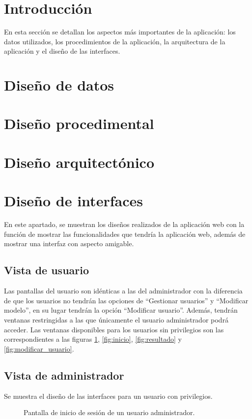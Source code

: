 
\section{Introducción}
En esta sección se detallan los aspectos más importantes de la aplicación: los datos utilizados, los procedimientos de la aplicación, la arquitectura de la aplicación y el diseño de las interfaces.

\section{Diseño de datos}

\section{Diseño procedimental}

\section{Diseño arquitectónico}

\section{Diseño de interfaces}
En este apartado, se muestran los diseños realizados de la aplicación web con la función de mostrar las funcionalidades que tendría la aplicación web, además de mostrar una interfaz con aspecto amigable.

\subsection{Vista de usuario}
Las pantallas del usuario son idénticas a las del administrador con la diferencia de que los usuarios no tendrán las opciones de ``Gestionar usuarios'' y ``Modificar modelo'', en su lugar tendrán la opción ``Modificar usuario''. Además, tendrán ventanas restringidas a las que únicamente el usuario administrador podrá acceder. Las ventanas disponibles para los usuarios sin privilegios son las correspondientes a las figuras \ref{fig:inicio_de_sesion}, \ref{fig:inicio}, \ref{fig:resultado} y \ref{fig:modificar_usuario}.

\subsection{Vista de administrador}
Se muestra el diseño de las interfaces para un usuario con privilegios.
\begin{figure}[h]
	\caption{Pantalla de inicio de sesión de un usuario administrador.}
	\label{fig:inicio_de_sesion}
\end{figure}


